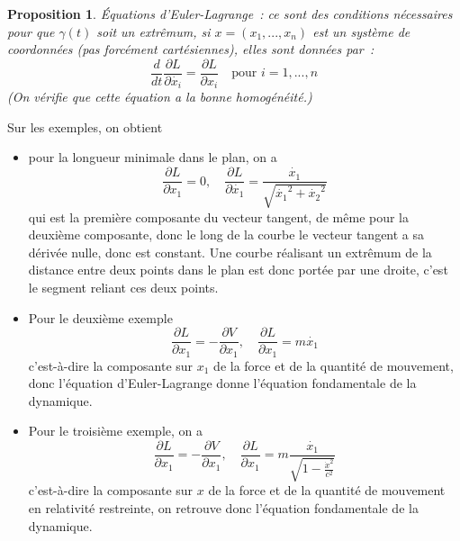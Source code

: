 \documentclass[a4paper,11pt]{article}
\newtheorem{prop}[thm]{Proposition}
\begin{document}
\begin{giacjshere}
\begin{prop}
\'Equations d'Euler-Lagrange~: 
ce sont des conditions n\'ecessaires
pour que $\gamma(t)$ soit un extr\^emum, si
$x=(x_1,...,x_n)$ est un syst\`eme de coordonn\'ees (pas
forc\'ement cart\'esiennes),
elles sont donn\'ees par~:
$$ \frac{d}{dt} \frac{\partial L}{\partial \dot{x_i}} = 
\frac{\partial L}{\partial x_i} \quad \mbox{pour } i=1,...,n$$
(On v\'erifie que cette \'equation a la bonne homog\'en\'eit\'e.)
\end{prop}

Sur les exemples, on obtient
\begin{itemize}
\item pour la longueur minimale dans le plan, on a 
$$\frac{\partial L}{\partial x_1}=0, \quad
\frac{\partial L} {\partial \dot{x_1}}=\frac{\dot{x_1}} {\sqrt{\dot{x_1}^2+\dot{x_2}^2}}
$$
qui est la premi\`ere composante du vecteur tangent,
de m\^eme pour la deuxi\`eme composante, 
donc le long de la courbe le vecteur tangent a sa d\'eriv\'ee
nulle, donc est constant. Une
courbe r\'ealisant un extr\^emum de la distance entre deux points
dans le plan est donc port\'ee par une droite, c'est le segment
reliant ces deux points.
\item Pour le deuxi\`eme exemple
$$ \frac{\partial L}{\partial x_1}=-\frac{\partial V}{\partial x_1},
\quad \frac{\partial L}{\partial x_1}=m\dot{x_1}
$$
c'est-\`a-dire la composante sur $x_1$ de la force et
de la quantit\'e de mouvement, donc l'\'equation d'Euler-Lagrange
donne l'\'equation fondamentale de la dynamique.
\item
Pour le troisi\`eme exemple, on a
$$ \frac{\partial L}{\partial x_1}=-\frac{\partial V}{\partial x_1},
\quad \frac{\partial L}{\partial x_1}=m\frac{\dot{x_1}}{\sqrt{1- 
\frac{\dot{x}^2}{c^2}}}
$$
c'est-\`a-dire la composante sur $x$ de la force et
de la quantit\'e de mouvement en relativit\'e restreinte,
on retrouve donc l'\'equation fondamentale de la dynamique.
\end{itemize}


\end{giacjshere}
\end{document}
